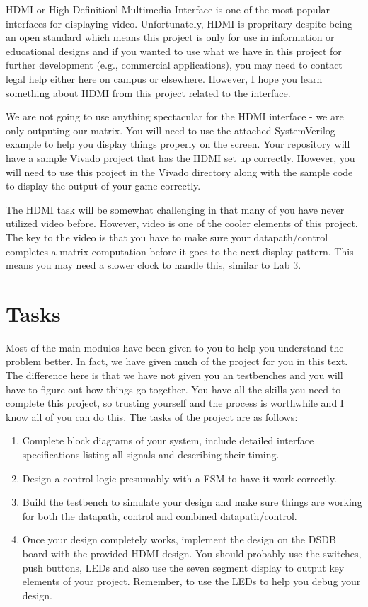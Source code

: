 \documentclass{article}
\begin{document}
HDMI or High-Definitionl Multimedia Interface is one of the most
popular interfaces for displaying video.  Unfortunately, HDMI is
propritary despite being an open standard
which means this project is only for use in information or educational
designs and if you wanted to use what we have in this project for
further development (e.g., commercial applications), you may need to
contact legal help either here on campus or elsewhere.  However, I
hope you learn something about HDMI from this project related to the
interface.

We are not going to use anything spectacular for the HDMI interface -
we are only outputing our matrix.  You will need to use the attached
SystemVerilog example to help you display things properly on the
screen.  Your repository will have a sample Vivado project that has
the HDMI set up correctly.  However, you will need to use this project
in the Vivado directory along with the sample code to display the output of your
game correctly.  

The HDMI task will be somewhat challenging in that many of you have
never utilized video before.  However, video is one of the cooler
elements of this project.  The key to the video is that you have to
make sure your datapath/control completes a matrix computation before
it goes to the next display pattern.  This means you may need a slower
clock to handle this, similar to Lab 3.  


\section{Tasks}

Most of the main modules have been given to you to help you understand the
problem better.   In fact, we have given much of the project for you
in this text.  The difference here is that we have not given you an
testbenches and you will have to figure out how things go together.
You have all the skills you need to complete this project, so trusting
yourself and the process is worthwhile and I know all of you can do
this.  The tasks of the project are as follows:
\begin{enumerate}
  \item Complete block diagrams of your system, include detailed
    interface specifications listing all signals and describing their
    timing.  
\item Design a control logic presumably with a FSM to have it work
  correctly.
\item  Build the testbench to simulate your design and make sure
  things are working for both the datapath, control and combined
  datapath/control.    
  \item Once your design completely works, implement the design on
    the DSDB board with the provided HDMI design.
    You should probably use the switches, push
    buttons, LEDs and also use the
    seven segment display to output key elements of your project.
    Remember, to use the LEDs to help you debug your design.      
\end{enumerate}
\end{document}
